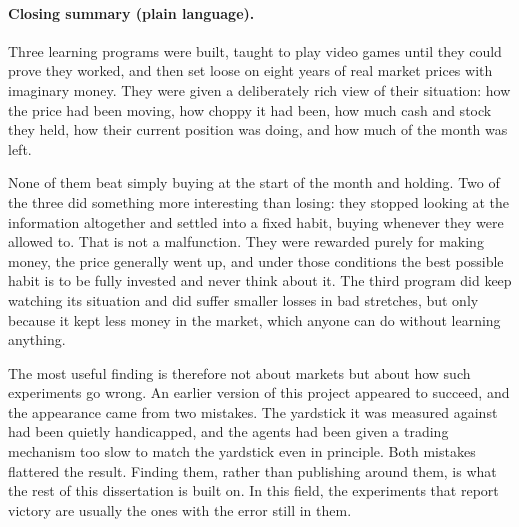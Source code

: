 \paragraph{Closing summary (plain language).} Three learning programs were
built, taught to play video games until they could prove they worked, and
then set loose on eight years of real market prices with imaginary money.
They were given a deliberately rich view of their situation: how the price
had been moving, how choppy it had been, how much cash and stock they held,
how their current position was doing, and how much of the month was left.

None of them beat simply buying at the start of the month and holding. Two
of the three did something more interesting than losing: they stopped looking
at the information altogether and settled into a fixed habit, buying whenever
they were allowed to. That is not a malfunction. They were rewarded purely for
making money, the price generally went up, and under those conditions the best
possible habit is to be fully invested and never think about it. The third
program did keep watching its situation and did suffer smaller losses in bad
stretches, but only because it kept less money in the market, which anyone can
do without learning anything.

The most useful finding is therefore not about markets but about how such
experiments go wrong. An earlier version of this project appeared to succeed,
and the appearance came from two mistakes. The yardstick it was measured
against had been quietly handicapped, and the agents had been given a trading
mechanism too slow to match the yardstick even in principle. Both mistakes
flattered the result. Finding them, rather than publishing around them, is
what the rest of this dissertation is built on. In this field, the
experiments that report victory are usually the ones with the error still in
them.
